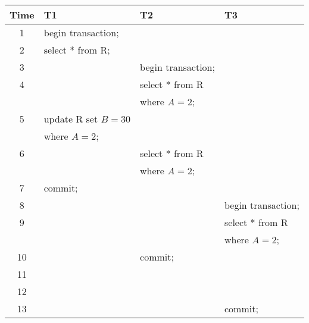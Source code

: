 \documentclass[addpoints,answers,12pt]{exam}
\begin{document}
\begin{questions}
\begin{parts}
\begin{tabular}{|c|l|l|l|} \hline
  Time & T1 & T2 & T3 \\ \hline
1 & begin transaction;              &                    & \\ \hline
2 & select * from R;                &                    & \\ \hline             
3 &                                 & begin transaction; & \\ \hline
4 &                                 & select * from R    & \\
  &                                 & where $A=2$;       & \\ \hline
5 & update R set $B=30$             &                    & \\
  & where $A=2$;                    &                    & \\ \hline
6 &                                 &  select * from R   & \\
  &                                 &  where $A=2$;      & \\ \hline
7 & commit;                         &                    & \\ \hline
8 &                                 &                    & begin transaction; \\ \hline
9 &                                 &                    & select * from R  \\
  &                                 &                    & where $A=2$; \\ \hline
10 &                                & commit;            & \\ \hline
11 & 
                                    &                     & \\ \hline
12 &                                &
                                                          & \\ \hline
13 &                                &                     & commit; \\ \hline
\end{tabular}


\end{parts}
\end{questions}
\end{document}
